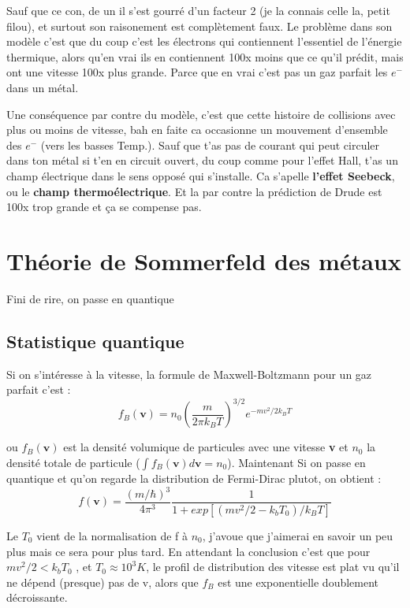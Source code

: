 \documentclass[a4paper]{report}
\begin{document}
\begin{enumerate}
 Sauf que ce con, de un il s'est gourré d'un facteur 2 (je la connais celle la, petit filou), et surtout son raisonement est complètement faux. Le problème dans son modèle c'est que du coup c'est les électrons qui contiennent l'essentiel de l'énergie thermique, alors qu'en vrai ils en contiennent 100x moins que ce qu'il prédit, mais ont une vitesse 100x plus grande. Parce que en vrai c'est pas un gaz parfait les $e^-$ dans un métal.
 
 Une conséquence par contre du modèle, c'est que cette histoire de collisions avec plus ou moins de vitesse, bah en faite ca occasionne un mouvement d'ensemble des $e^-$ (vers les basses Temp.). Sauf que t'as pas de courant qui peut circuler dans ton métal si t'en en circuit ouvert, du coup comme pour l'effet Hall, t'as un champ électrique dans le sens opposé qui s'installe. Ca s'apelle \textbf{l'effet Seebeck}, ou le \textbf{champ thermoélectrique}. Et la par contre la prédiction de Drude est 100x trop grande et ça se compense pas.
 
 \end{enumerate}
 
 \chapter{Théorie de Sommerfeld des métaux}
 Fini de rire, on passe en quantique
 \section{Statistique quantique}
 Si on s'intéresse à la vitesse, la formule de Maxwell-Boltzmann pour un gaz parfait c'est : $$ f_B(\mathbf{v}) = n_0 \left(\frac{m}{2 \pi k_B T}\right)^{3/2} e^{-mv^2/2 k_B T} $$
 
 ou $f_B(\mathbf{v})$ est la densité volumique de particules avec une vitesse \textbf{v} et $n_0$ la densité totale de particule ($\int f_B(\mathbf{v}) d\mathbf{v} = n_0$). Maintenant Si on passe en quantique et qu'on regarde la distribution de Fermi-Dirac plutot, on obtient : $$ f(\mathbf{v})=\frac{(m/\hbar)^3}{4\pi^3}\frac{1}{1+exp[(mv^2/2-k_b T_0)/k_B T]}$$
 
 Le $T_0$ vient de la normalisation de f à $n_0$, j'avoue que j'aimerai en savoir un peu plus  mais ce sera pour plus tard. En attendant la conclusion c'est que pour $mv^2/2 < k_b T_0$ , et $T_0 \approx 10^3 K$, le profil de distribution des vitesse est plat vu qu'il ne dépend (presque) pas de v, alors que $f_B$ est une exponentielle doublement décroissante.
 
\end{document}
